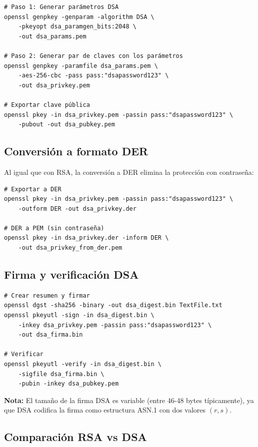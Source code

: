 \begin{lstlisting}[caption=Generación de claves DSA]
# Paso 1: Generar parámetros DSA
openssl genpkey -genparam -algorithm DSA \
    -pkeyopt dsa_paramgen_bits:2048 \
    -out dsa_params.pem

# Paso 2: Generar par de claves con los parámetros
openssl genpkey -paramfile dsa_params.pem \
    -aes-256-cbc -pass pass:"dsapassword123" \
    -out dsa_privkey.pem

# Exportar clave pública
openssl pkey -in dsa_privkey.pem -passin pass:"dsapassword123" \
    -pubout -out dsa_pubkey.pem
\end{lstlisting}

\subsection{Conversión a formato DER}

Al igual que con RSA, la conversión a DER elimina la protección con contraseña:

\begin{lstlisting}[caption=Conversión DSA a DER y de vuelta]
# Exportar a DER
openssl pkey -in dsa_privkey.pem -passin pass:"dsapassword123" \
    -outform DER -out dsa_privkey.der

# DER a PEM (sin contraseña)
openssl pkey -in dsa_privkey.der -inform DER \
    -out dsa_privkey_from_der.pem
\end{lstlisting}

\subsection{Firma y verificación DSA}

\begin{lstlisting}[caption=Firma y verificación DSA]
# Crear resumen y firmar
openssl dgst -sha256 -binary -out dsa_digest.bin TextFile.txt
openssl pkeyutl -sign -in dsa_digest.bin \
    -inkey dsa_privkey.pem -passin pass:"dsapassword123" \
    -out dsa_firma.bin

# Verificar
openssl pkeyutl -verify -in dsa_digest.bin \
    -sigfile dsa_firma.bin \
    -pubin -inkey dsa_pubkey.pem
\end{lstlisting}

\textbf{Nota:} El tamaño de la firma DSA es variable (entre 46-48 bytes típicamente), ya que DSA codifica la firma como estructura ASN.1 con dos valores $(r, s)$.

\subsection{Comparación RSA vs DSA}

